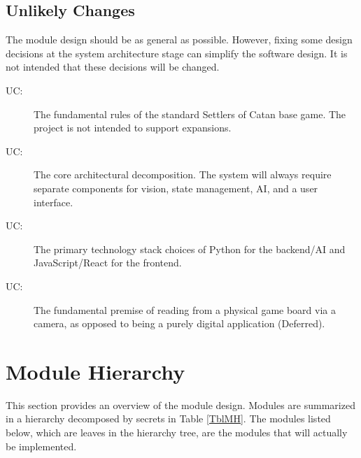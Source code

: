 \documentclass[12pt, titlepage]{article}
\newcounter{ucnum}
\newcommand{\uctheucnum}{UC\theucnum}
\begin{document}
\subsection{Unlikely Changes} \label{SecUchange}

The module design should be as general as possible.
However, fixing some design decisions at the system architecture stage can simplify the software design.
It is not intended that these decisions will be changed.

\begin{description}
\item[ \uctheucnum \label{ucGameRules}:] The fundamental rules of the standard Settlers of Catan base game.
The project is not intended to support expansions.
\item[ \uctheucnum \label{ucArchitecture}:] The core architectural decomposition.
The system will always require separate components for vision, state management, AI, and a user interface.
\item[ \uctheucnum \label{ucTechStack}:] The primary technology stack choices of Python for the backend/AI and JavaScript/React for the frontend.
\item[ \uctheucnum \label{ucInputSource}:] The fundamental premise of reading from a physical game board via a camera, as opposed to being a purely digital application (Deferred).
\end{description}


\section{Module Hierarchy} \label{SecMH}

This section provides an overview of the module design.
Modules are summarized in a hierarchy decomposed by secrets in Table \ref{TblMH}.
The modules listed below, which are leaves in the hierarchy tree, are the modules that will actually be implemented.
\end{document}
